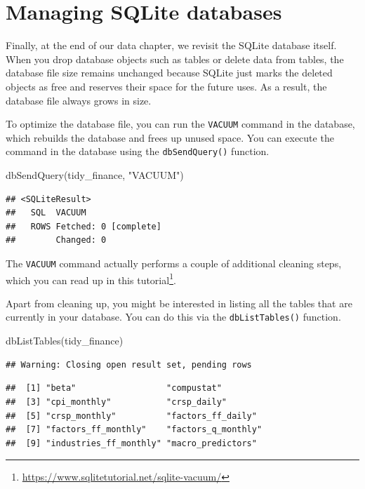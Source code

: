 \documentclass[
]{book}
\newenvironment{Shaded}{\begin{snugshade}}{\end{snugshade}}
\newcommand{\FunctionTok}[1]{\textcolor[rgb]{0,0,0}{#1}}
\newcommand{\NormalTok}[1]{#1}
\newcommand{\StringTok}[1]{\textcolor[rgb]{0.5,0.5,0.5}{#1}}
\renewcommand{\href}[2]{#2\footnote{\url{#1}}}
\begin{document}
\hypertarget{managing-sqlite-databases}{%
\section{Managing SQLite databases}\label{managing-sqlite-databases}}

Finally, at the end of our data chapter, we revisit the SQLite database itself. When you drop database objects such as tables or delete data from tables, the database file size remains unchanged because SQLite just marks the deleted objects as free and reserves their space for the future uses. As a result, the database file always grows in size.

To optimize the database file, you can run the \texttt{VACUUM} command in the database, which rebuilds the database and frees up unused space. You can execute the command in the database using the \texttt{dbSendQuery()} function.

\begin{Shaded}
\begin{Highlighting}[]
\FunctionTok{dbSendQuery}\NormalTok{(tidy\_finance, }\StringTok{"VACUUM"}\NormalTok{)}
\end{Highlighting}
\end{Shaded}

\begin{verbatim}
## <SQLiteResult>
##   SQL  VACUUM
##   ROWS Fetched: 0 [complete]
##        Changed: 0
\end{verbatim}

The \texttt{VACUUM} command actually performs a couple of additional cleaning steps, which you can read up in \href{https://www.sqlitetutorial.net/sqlite-vacuum/}{this tutorial}.

Apart from cleaning up, you might be interested in listing all the tables that are currently in your database. You can do this via the \texttt{dbListTables()} function.

\begin{Shaded}
\begin{Highlighting}[]
\FunctionTok{dbListTables}\NormalTok{(tidy\_finance)}
\end{Highlighting}
\end{Shaded}

\begin{verbatim}
## Warning: Closing open result set, pending rows
\end{verbatim}

\begin{verbatim}
##  [1] "beta"                  "compustat"            
##  [3] "cpi_monthly"           "crsp_daily"           
##  [5] "crsp_monthly"          "factors_ff_daily"     
##  [7] "factors_ff_monthly"    "factors_q_monthly"    
##  [9] "industries_ff_monthly" "macro_predictors"
\end{verbatim}
\end{document}
